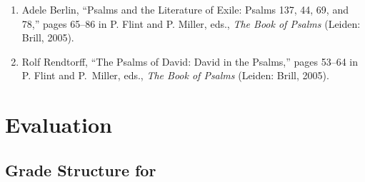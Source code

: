 \documentclass[titlepage]{article}
\begin{document}
\begin{enumerate}
  \item Adele Berlin, “Psalms and the Literature of Exile: Psalms 137, 44, 69, and 78,” pages 65--86 in P. Flint and P. Miller, eds., \emph{The Book of Psalms} (Leiden: Brill, 2005).


  \item Rolf Rendtorff, “The Psalms of David: David in the Psalms,” pages 53–64 in P. Flint and P.~Miller, eds., \emph{The Book of Psalms} (Leiden: Brill, 2005).

\end{enumerate}

\section{Evaluation}
\label{evaluation}

\subsection{Grade Structure for \ccode}
\label{structure}
\end{document}
